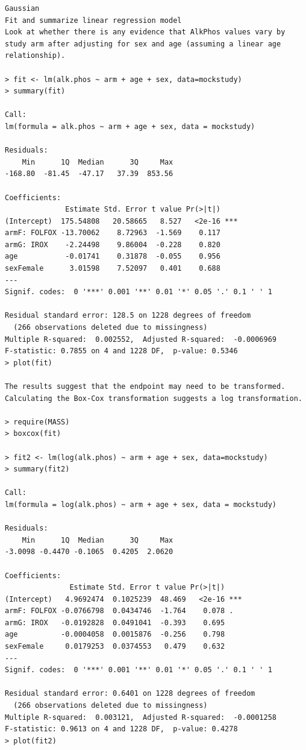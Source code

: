 \documentclass[
]{book}
\begin{document}
\begin{verbatim}
Gaussian
Fit and summarize linear regression model
Look at whether there is any evidence that AlkPhos values vary by study arm after adjusting for sex and age (assuming a linear age relationship).

> fit <- lm(alk.phos ~ arm + age + sex, data=mockstudy)
> summary(fit)

Call:
lm(formula = alk.phos ~ arm + age + sex, data = mockstudy)

Residuals:
    Min      1Q  Median      3Q     Max 
-168.80  -81.45  -47.17   37.39  853.56 

Coefficients:
              Estimate Std. Error t value Pr(>|t|)    
(Intercept)  175.54808   20.58665   8.527   <2e-16 ***
armF: FOLFOX -13.70062    8.72963  -1.569    0.117    
armG: IROX    -2.24498    9.86004  -0.228    0.820    
age           -0.01741    0.31878  -0.055    0.956    
sexFemale      3.01598    7.52097   0.401    0.688    
---
Signif. codes:  0 '***' 0.001 '**' 0.01 '*' 0.05 '.' 0.1 ' ' 1

Residual standard error: 128.5 on 1228 degrees of freedom
  (266 observations deleted due to missingness)
Multiple R-squared:  0.002552,  Adjusted R-squared:  -0.0006969 
F-statistic: 0.7855 on 4 and 1228 DF,  p-value: 0.5346
> plot(fit)

The results suggest that the endpoint may need to be transformed. Calculating the Box-Cox transformation suggests a log transformation.

> require(MASS)
> boxcox(fit)

> fit2 <- lm(log(alk.phos) ~ arm + age + sex, data=mockstudy)
> summary(fit2)

Call:
lm(formula = log(alk.phos) ~ arm + age + sex, data = mockstudy)

Residuals:
    Min      1Q  Median      3Q     Max 
-3.0098 -0.4470 -0.1065  0.4205  2.0620 

Coefficients:
               Estimate Std. Error t value Pr(>|t|)    
(Intercept)   4.9692474  0.1025239  48.469   <2e-16 ***
armF: FOLFOX -0.0766798  0.0434746  -1.764    0.078 .  
armG: IROX   -0.0192828  0.0491041  -0.393    0.695    
age          -0.0004058  0.0015876  -0.256    0.798    
sexFemale     0.0179253  0.0374553   0.479    0.632    
---
Signif. codes:  0 '***' 0.001 '**' 0.01 '*' 0.05 '.' 0.1 ' ' 1

Residual standard error: 0.6401 on 1228 degrees of freedom
  (266 observations deleted due to missingness)
Multiple R-squared:  0.003121,  Adjusted R-squared:  -0.0001258 
F-statistic: 0.9613 on 4 and 1228 DF,  p-value: 0.4278
> plot(fit2)


\end{verbatim}
\end{document}
